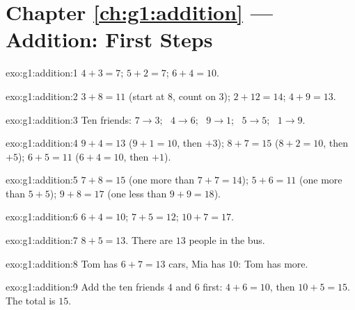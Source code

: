 \section*{Chapter \ref{ch:g1:addition} --- Addition: First Steps}

\begin{solution}{exo:g1:addition:1}
$4 + 3 = 7$; \quad $5 + 2 = 7$; \quad $6 + 4 = 10$.
\end{solution}

\begin{solution}{exo:g1:addition:2}
$3 + 8 = 11$ (start at $8$, count on $3$); \quad
$2 + 12 = 14$; \quad $4 + 9 = 13$.
\end{solution}

\begin{solution}{exo:g1:addition:3}
Ten friends: $7 \to 3$; \ $4 \to 6$; \ $9 \to 1$; \ $5 \to 5$;
\ $1 \to 9$.
\end{solution}

\begin{solution}{exo:g1:addition:4}
$9 + 4 = 13$ ($9 + 1 = 10$, then $+3$); \quad
$8 + 7 = 15$ ($8 + 2 = 10$, then $+5$); \quad
$6 + 5 = 11$ ($6 + 4 = 10$, then $+1$).
\end{solution}

\begin{solution}{exo:g1:addition:5}
$7 + 8 = 15$ (one more than $7 + 7 = 14$); \quad
$5 + 6 = 11$ (one more than $5 + 5$); \quad
$9 + 8 = 17$ (one less than $9 + 9 = 18$).
\end{solution}

\begin{solution}{exo:g1:addition:6}
$6 + 4 = 10$; \quad $7 + 5 = 12$; \quad $10 + 7 = 17$.
\end{solution}

\begin{solution}{exo:g1:addition:7}
$8 + 5 = 13$. There are $13$ people in the bus.
\end{solution}

\begin{solution}{exo:g1:addition:8}
Tom has $6 + 7 = 13$ cars, Mia has $10$: Tom has more.
\end{solution}

\begin{solution}{exo:g1:addition:9}
Add the ten friends $4$ and $6$ first: $4 + 6 = 10$, then
$10 + 5 = 15$. The total is $15$.
\end{solution}
